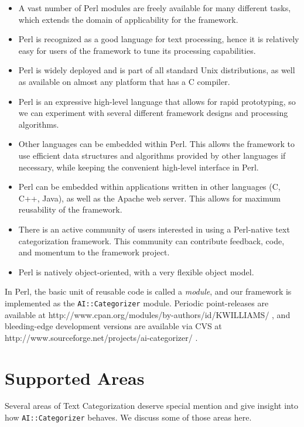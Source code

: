 \documentclass[a4paper,twocolumn]{article}
\begin{document}
\begin{itemize}
\item A vast number of Perl modules are freely available for many different tasks, which extends the domain of applicability for the framework.
\item Perl is recognized as a good language for text processing, hence it is relatively easy for users of the framework to tune its processing capabilities.
\item Perl is widely deployed and is part of all standard Unix distributions, as well as available on almost any platform that has a C compiler.
\item Perl is an expressive high-level language that allows for rapid prototyping, so we can experiment with several different framework designs and processing algorithms.
\item Other languages can be embedded within Perl.  This allows the framework to use efficient data structures and algorithms provided by other languages if necessary, while keeping the convenient high-level interface in Perl.
\item Perl can be embedded within applications written in other languages (C, C++, Java), as well as the Apache web server.  This allows for maximum reusability of the framework.
\item There is an active community of users interested in using a Perl-native text categorization framework.  This community can contribute feedback, code, and momentum to the framework project.
\item Perl is natively object-oriented, with a very flexible object model. \cite{conway:99}
\end{itemize}

In Perl, the basic unit of reusable code is called a \emph{module}, and our framework is implemented as the \texttt{AI::Categorizer} module.  Periodic point-releases are available at http://www.cpan.org/modules/by-authors/id/KWILLIAMS/ , and bleeding-edge development versions are available via CVS at http://www.sourceforge.net/projects/ai-categorizer/ .

\section{Supported Areas}

Several areas of Text Categorization deserve special mention and give insight into how \texttt{AI::Categorizer} behaves.  We discuss some of those areas here.
\end{document}

